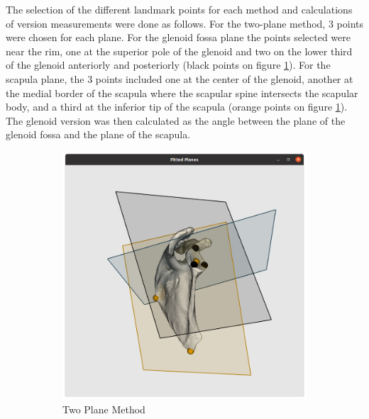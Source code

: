 The selection of the different landmark points for each method and calculations of version measurements were done as follows. For the two-plane method, 3 points were chosen for each plane. For the glenoid fossa plane the points selected were near the rim, one at the superior pole of the glenoid and two on the lower third of the glenoid anteriorly and posteriorly (black points on figure \ref{fig:visplanes}).  For the scapula plane, the 3 points included one at the center of the glenoid, another at the medial border of the scapula where the scapular spine intersects the scapular body, and a third at the inferior tip of the scapula (orange points on figure \ref{fig:visplanes}). The glenoid version was then calculated as the angle between the plane of the glenoid fossa and the plane of the scapula. 
\begin{figure}
        \begin{center}
                \begin{subfigure}[b]{0.31\linewidth}
			\includegraphics[width=\linewidth]{figures/planes_vis.png}
			\caption{\label{fig:visplanes}Two Plane Method}
		\end{subfigure}	
                \begin{subfigure}[b]{0.28\linewidth}

\end{subfigure}
\end{center}
\end{figure}
